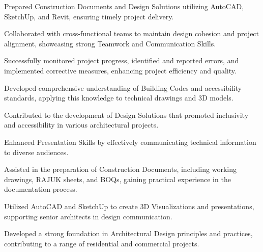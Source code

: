 \begin{minipage}[t]{0.63\textwidth}
    \vspace{15pt} %
    
    \begin{tightemize}
      \item Prepared Construction Documents and Design Solutions utilizing AutoCAD, SketchUp, and Revit, ensuring timely project delivery.
      \item Collaborated with cross-functional teams to maintain design cohesion and project alignment, showcasing strong Teamwork and Communication Skills.
      \item Successfully monitored project progress, identified and reported errors, and implemented corrective measures, enhancing project efficiency and quality.
    \end{tightemize}
  \sectionsep

    \vspace{5pt}
    \begin{tightemize}
      \item Developed comprehensive understanding of Building Codes and accessibility standards, applying this knowledge to technical drawings and 3D models.
      \item Contributed to the development of Design Solutions that promoted inclusivity and accessibility in various architectural projects.
      \item Enhanced Presentation Skills by effectively communicating technical information to diverse audiences.
    \end{tightemize}
  \sectionsep
  
    \vspace{5pt}
    \begin{tightemize}
      \item Assisted in the preparation of Construction Documents, including working drawings, RAJUK sheets, and BOQs, gaining practical experience in the documentation process.
      \item Utilized AutoCAD and SketchUp to create 3D Visualizations and presentations, supporting senior architects in design communication.
      \item Developed a strong foundation in Architectural Design principles and practices, contributing to a range of residential and commercial projects.
    \end{tightemize}
  \sectionsep

  \end{minipage}
